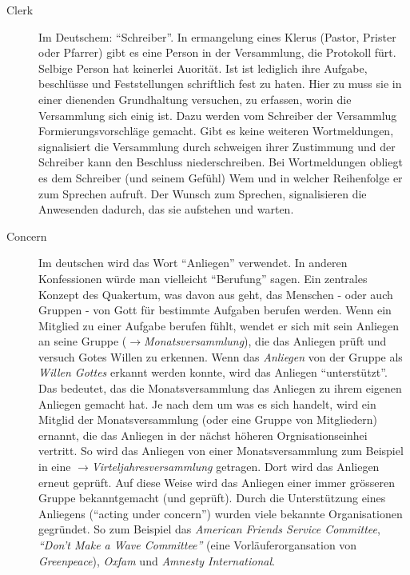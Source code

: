 \begin{description}
 \item[Clerk] Im Deutschem: "`Schreiber"'. In ermangelung eines Klerus (Pastor,
Prister oder Pfarrer) gibt es eine Person in der Versammlung, die Protokoll
fürt. Selbige Person hat keinerlei Auorität. Ist ist lediglich ihre Aufgabe,
beschlüsse und Feststellungen schriftlich fest zu haten. Hier zu muss sie in
einer dienenden Grundhaltung versuchen, zu erfassen, worin die Versammlung sich
einig ist. Dazu werden vom Schreiber der Versammlug Formierungsvorschläge
gemacht. Gibt es keine weiteren Wortmeldungen, signalisiert die Versammlung
durch schweigen ihrer Zustimmung und der Schreiber kann den Beschluss
niederschreiben. Bei Wortmeldungen obliegt es dem Schreiber (und seinem Gefühl)
Wem und in welcher Reihenfolge er zum Sprechen aufruft. Der Wunsch zum Sprechen,
signalisieren die Anwesenden dadurch, das sie aufstehen und warten.

\item[Concern] Im deutschen wird das Wort ``Anliegen'' verwendet. In anderen
Konfessionen würde man vielleicht ``Berufung'' sagen. Ein zentrales Konzept des
Quakertum, was davon aus geht, das Menschen - oder auch Gruppen -  von Gott für
bestimmte Aufgaben berufen werden. Wenn ein Mitglied zu einer Aufgabe berufen
fühlt, wendet er sich mit sein Anliegen an seine Gruppe
($\to$\textit{Monatsversammlung}), die das Anliegen prüft und versuch Gotes
Willen zu erkennen. Wenn das \textit{Anliegen} von der Gruppe als \textit{Willen
Gottes} erkannt werden konnte, wird das Anliegen ``unterstützt''. Das bedeutet,
das die Monatsversammlung das Anliegen zu ihrem eigenen Anliegen gemacht hat. Je
nach dem um was es sich handelt, wird ein Mitglid der Monatsversammlung (oder
eine Gruppe von Mitgliedern) ernannt, die das Anliegen in der nächst höheren
Orgnisationseinhei vertritt. So wird das Anliegen von einer Monatsversammlung
zum Beispiel in eine $\to$\textit{Virteljahresversammlung} getragen. Dort wird
das Anliegen erneut geprüft. Auf diese Weise wird das Anliegen einer immer
grösseren Gruppe bekanntgemacht (und geprüft). Durch die Unterstützung eines
Anliegens ("`acting under concern"') wurden viele bekannte Organisationen
gegründet. So zum Beispiel das \textit{American Friends Service Committee},
\textit{``Don't Make a Wave Committee''} (eine Vorläuferorgansation von
\textit{Greenpeace}), \textit{Oxfam} und \textit{Amnesty International}.



\end{description}

